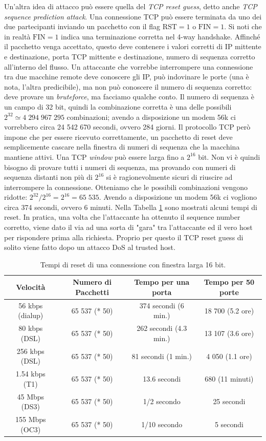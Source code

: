 Un'altra idea di attacco può essere quella del \textit{TCP reset guess}, detto anche \textit{TCP sequence prediction attack}. Una connessione TCP può essere terminata da uno dei due partecipanti inviando un pacchetto con il flag $\text{RST}=1$ o $\text{FIN}=1$. Si noti che in realtà $\text{FIN}=1$ indica una terminazione corretta nel 4-way handshake. Affinché il pacchetto venga accettato, questo deve contenere i valori corretti di IP mittente e destinazione, porta TCP mittente e destinazione, numero di sequenza corretto all'interno del flusso. Un attaccante che vorrebbe interrompere una connessione tra due macchine remote deve conoscere gli IP, può indovinare le porte (una è nota, l'altra predicibile), ma non può conoscere il numero di sequenza corretto: deve provare un \textit{bruteforce}, ma facciamo qualche conto. Il numero di sequenza è un campo di 32 bit, quindi la combinazione corretta è una delle possibili $2^{32} \simeq 4\;294\;967\;295$ combinazioni; avendo a disposizione un modem 56k ci vorrebbero circa 24 542 670 secondi, ovvero 284 giorni. Il protocollo TCP però impone che per essere ricevuto correttamente, un pacchetto di reset deve semplicemente cascare nella finestra di numeri di sequenza che la macchina mantiene attivi. Una TCP \textit{window} può essere larga fino a $2^{16}$ bit. Non vi è quindi bisogno di provare tutti i numeri di sequenza, ma provando con numeri di sequenza distanti non più di $2^{16}$ si è ragionevolmente sicuri di riuscire ad interrompere la connessione. Otteniamo che le possibili combinazioni vengono ridotte: $2^{32}/2^{16} = 2^{16} = 65\;535$. Avendo a disposizione un modem 56k ci vogliono circa 374 secondi, ovvero 6 minuti. Nella Tabella \ref{tab:TCP-reset-guess} sono mostrati alcuni tempi di reset.  In pratica, una volta che l'attaccante ha ottenuto il sequence number corretto, viene dato il via ad una sorta di "gara" tra l'attaccante ed il vero host per rispondere prima alla richiesta. Proprio per questo il TCP reset guess di solito viene fatto dopo un attacco DoS al trusted host.
\begin{table}[t!]
	\centering
	\begin{tabular}{cccc}
		\toprule[0.5ex]
		\textbf{Velocità} & \textbf{Numero di Pacchetti} & \textbf{Tempo per una porta} & \textbf{Tempo per 50 porte}\\
		\midrule
		56 kbps (dialup) & 65 537 (* 50) & 374 secondi (6 min.) & 18 700 (5.2 ore)\\
		80 kbps (DSL) & 65 537 (* 50) & 262 secondi (4.3 min.) & 13 107 (3.6 ore)\\
		256 kbps (DSL) & 65 537 (* 50) & 81 secondi (1 min.) & 4 050 (1.1 ore)\\
		1.54 kbps (T1) & 65 537 (* 50) & 13.6 secondi & 680 (11 minuti)\\
		45 Mbps (DS3) & 65 537 (* 50) & 1/2 secondo & 25 secondi\\
		155 Mbps (OC3) & 65 537 (* 50) & 1/10 secondo & 5 secondi\\
		\bottomrule[0.5ex]
	\end{tabular}
	\caption{Tempi di reset di una connessione con finestra larga 16 bit.}
	\label{tab:TCP-reset-guess}
\end{table}


